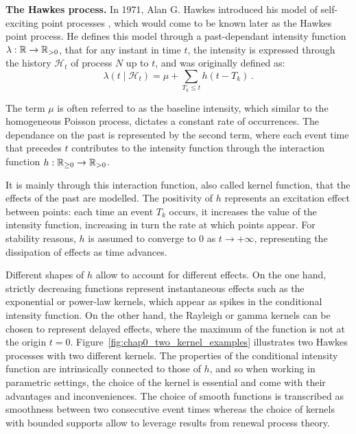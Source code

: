     \textbf{The Hawkes process.}
    In 1971, Alan G. Hawkes introduced his model of self-exciting point processes \parencite{Hawkes1971}, which would come to be known later as the Hawkes point process.
    He defines this model through a past-dependant intensity function $\lambda:{\mathbb R}\to{\mathbb R}_{>0}$, that for any instant in time $t$, the intensity is expressed through the history $\mathcal{H}_t$ of process $N$ up to $t$, and was originally defined as:
    \begin{equation}\label{eq:chap0_univariate_linear_intensity}
        \lambda(t\mid \mathcal{H}_t) = \mu + \sum_{T_k \leq t}{h(t-T_k)}\,.
    \end{equation}

    The term $\mu$ is often referred to as the baseline intensity, which similar to the homogeneous Poisson process, dictates a constant rate of occurrences. 
    The dependance on the past is represented by the second term, where each event time that precedes $t$ contributes to the intensity function through the interaction function $h:{\mathbb R}_{\geq0}\to{\mathbb R}_{>0}$.

    It is mainly through this interaction function, also called kernel function, that the effects of the past are modelled. 
    The positivity of $h$ represents an excitation effect between points: each time an event $T_k$ occurs, it increases the value of the intensity function, increasing in turn the rate at which points appear.
    For stability reasons, $h$ is assumed to converge to $0$ as $t\to+\infty$, representing the dissipation of effects as time advances.

    Different shapes of $h$ allow to account for different effects. 
    On the one hand, strictly decreasing functions represent instantaneous effects such as the exponential or power-law kernels, which appear as spikes in the conditional intensity function. 
    On the other hand, the Rayleigh or gamma kernels can be chosen to represent delayed effects, where the maximum of the function is not at the origin $t=0$. Figure~\ref{fig:chap0_two_kernel_examples} illustrates two Hawkes processes with two different kernels.
    The properties of the conditional intensity function are intrinsically connected to those of $h$, and so when working in parametric settings, the choice of the kernel is essential and come with their advantages and inconveniences.
    The choice of smooth functions is transcribed as smoothness between two consecutive event times whereas the choice of kernels with bounded supports allow to leverage results from renewal process theory.

